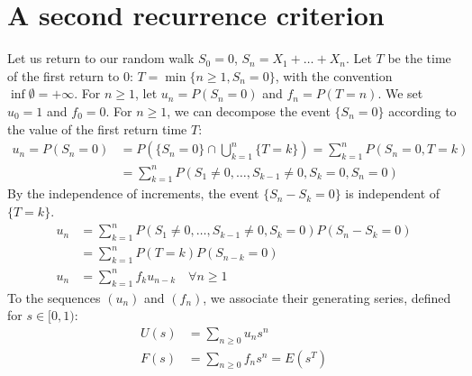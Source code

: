 \section{A second recurrence criterion}%
Let us return to our random walk $S_0=0$, $S_n=X_1+\dots+X_n$.
Let $T$ be the time of the first return to 0: $T=\min\{n \ge 1, S_n=0\}$, with the convention $\inf \emptyset = +\infty$.
For $n \ge 1$, let $u_n = P(S_n=0)$ and $f_n = P(T=n)$. We set $u_0=1$ and $f_0=0$.
For $n \ge 1$, we can decompose the event $\{S_n=0\}$ according to the value of the first return time $T$:%
\begin{align*}
    u_n = P(S_n=0) &= P(\{S_n=0\} \cap \bigcup_{k=1}^n \{T=k\}) = \sum_{k=1}^n P(S_n=0, T=k) \\
    &= \sum_{k=1}^n P(S_1 \neq 0, \dots, S_{k-1} \neq 0, S_k=0, S_n=0)
\end{align*}%
By the independence of increments, the event $\{S_n-S_k=0\}$ is independent of $\{T=k\}$.%
\begin{align*}
    u_n &= \sum_{k=1}^n P(S_1 \neq 0, \dots, S_{k-1} \neq 0, S_k=0) P(S_n-S_k=0) \\
    &= \sum_{k=1}^n P(T=k) P(S_{n-k}=0) \\
    u_n &= \sum_{k=1}^n f_k u_{n-k} \quad \forall n \ge 1
\end{align*}%
To the sequences $(u_n)$ and $(f_n)$, we associate their generating series, defined for $s \in [0,1)$:%
\begin{align*}
    U(s) &= \sum_{n \ge 0} u_n s^n \\
    F(s) &= \sum_{n \ge 0} f_n s^n = E(s^T)
\end{align*}%
